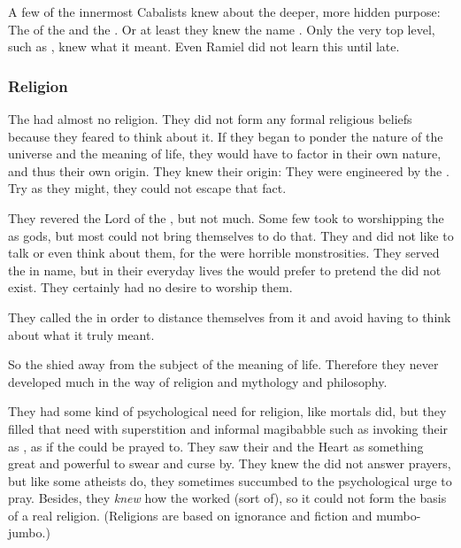 A few of the innermost Cabalists knew about the deeper, more hidden purpose: 
The  of the \baneking \Voidbringer and the \noggyal {}.
Or at least they knew the name . 
Only the very top level, such as \Azraid, knew what it meant.
Even Ramiel did not learn this until late. 





\subsubsection{Religion}
The \resphain had almost no religion.
They did not form any formal religious beliefs because they feared to think about it.
If they began to ponder the nature of the universe and the meaning of life, they would have to factor in their own nature, and thus their own origin.
They knew their origin: They were engineered by the \banes.
Try as they might, they could not escape that fact.

They revered the Lord of the \SitraAchra, but not much.
Some few took to worshipping the \SitraAchras as gods, but most could not bring themselves to do that.
They  and did not like to talk or even think about them, for the \banes were horrible monstrosities.
They served the \banelords in name, but in their everyday lives the \resphain would prefer to pretend the \banelords did not exist.
They certainly had no desire to worship them.

They called the \SitraAchra {} in order to distance themselves from it and avoid having to think about what it truly meant. 

So the \resphain shied away from the subject of the meaning of life.
Therefore they never developed much in the way of religion and mythology and philosophy.

They had some kind of psychological need for religion, like mortals did, but they filled that need with superstition and informal magibabble such as invoking their \matrices as , as if the \matrices could be prayed to.
They saw their \matrices and the Heart as something great and powerful to swear and curse by. 
They knew the \matrices did not answer prayers, but like some atheists do, they sometimes succumbed to the psychological urge to pray.
Besides, they \emph{knew} how the \matrices worked (sort of), so it could not form the basis of a real religion. 
(Religions are based on ignorance and fiction and mumbo-jumbo.)







